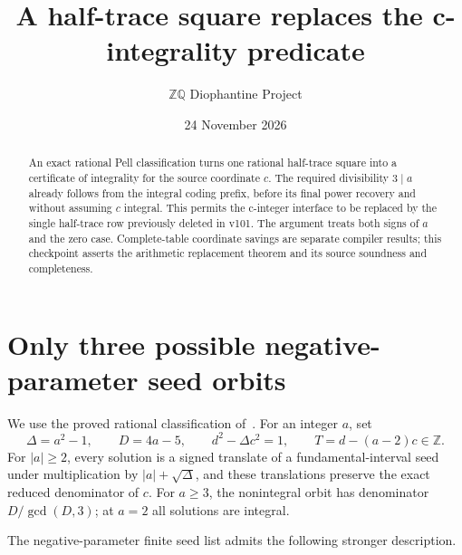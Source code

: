 \documentclass[11pt]{article}
\title{A half-trace square replaces the c-integrality predicate}
\author{\(\mathbb Z\mathbb Q\) Diophantine Project}
\date{24 November 2026}
\newcommand{\Z}{\mathbb Z}\newcommand{\Q}{\mathbb Q}
\begin{document}
\maketitle
\begin{abstract}
An exact rational Pell classification turns one rational half-trace
square into a certificate of integrality for the source coordinate
\(c\). The required divisibility \(3\mid a\) already follows from
the integral coding prefix, before its final power recovery and without
assuming \(c\) integral. This permits the c-integer interface to be
replaced by the single half-trace row previously deleted in v101.
The argument treats both signs of \(a\) and the zero case.
Complete-table coordinate savings are separate compiler results;
this checkpoint asserts the arithmetic replacement theorem and its
source soundness and completeness.
\end{abstract}

\section{Only three possible negative-parameter seed orbits}

We use the proved rational classification of~\cite{Classification}.
For an integer \(a\), set
\[
 \Delta=a^2-1,\qquad D=4a-5,
 \qquad d^2-\Delta c^2=1,\qquad T=d-(a-2)c\in\Z.
\]
For \(|a|\ge2\), every solution is a signed translate of a
fundamental-interval seed under multiplication by
\(|a|+\sqrt\Delta\), and these translations preserve the exact
reduced denominator of \(c\). For \(a\ge3\), the nonintegral
orbit has denominator \(D/\gcd(D,3)\); at \(a=2\) all solutions
are integral.

The negative-parameter finite seed list admits the following stronger
description.
\end{document}
